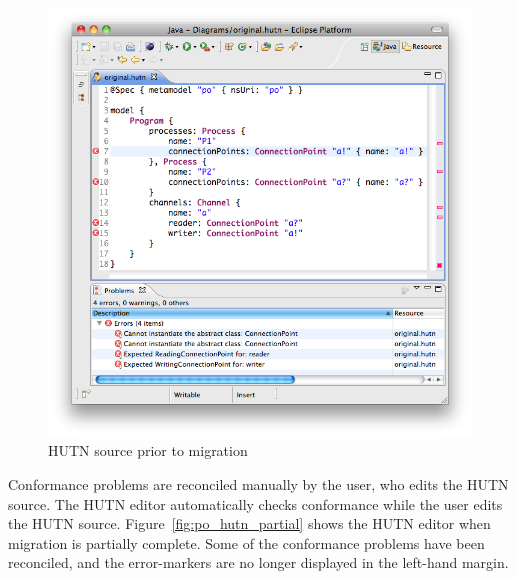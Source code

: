\begin{figure}[htbp]
  \centering
  \includegraphics[width=13.5cm]{6.Evaluation/images/user_driven/po_hutn.png}
  \caption{HUTN source prior to migration}
  \label{fig:po_hutn}
\end{figure}

Conformance problems are reconciled manually by the user, who edits the HUTN source. The HUTN editor automatically checks conformance while the user edits the HUTN source. Figure~\ref{fig:po_hutn_partial} shows the HUTN editor when migration is partially complete. Some of the conformance problems have been reconciled, and the error-markers are no longer displayed in the left-hand margin.

